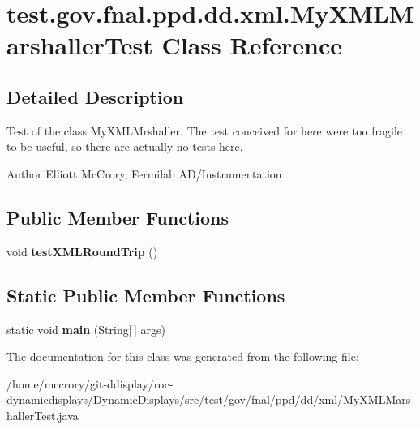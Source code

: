 \hypertarget{classtest_1_1gov_1_1fnal_1_1ppd_1_1dd_1_1xml_1_1MyXMLMarshallerTest}{\section{test.\-gov.\-fnal.\-ppd.\-dd.\-xml.\-My\-X\-M\-L\-Marshaller\-Test Class Reference}
\label{classtest_1_1gov_1_1fnal_1_1ppd_1_1dd_1_1xml_1_1MyXMLMarshallerTest}
}


\subsection{Detailed Description}
Test of the class My\-X\-M\-L\-Mrshaller. The test conceived for here were too fragile to be useful, so there are actually no tests here.

\begin{DoxyAuthor}{Author}
Elliott Mc\-Crory, Fermilab A\-D/\-Instrumentation 
\end{DoxyAuthor}
\subsection*{Public Member Functions}
\begin{DoxyCompactItemize}
\item 
\hypertarget{classtest_1_1gov_1_1fnal_1_1ppd_1_1dd_1_1xml_1_1MyXMLMarshallerTest_a2c6aabb19538d73b8de668f93bf4cc74}{void {\bfseries test\-X\-M\-L\-Round\-Trip} ()}\label{classtest_1_1gov_1_1fnal_1_1ppd_1_1dd_1_1xml_1_1MyXMLMarshallerTest_a2c6aabb19538d73b8de668f93bf4cc74}

\end{DoxyCompactItemize}
\subsection*{Static Public Member Functions}
\begin{DoxyCompactItemize}
\item 
\hypertarget{classtest_1_1gov_1_1fnal_1_1ppd_1_1dd_1_1xml_1_1MyXMLMarshallerTest_aa40a509dd3eac8eedd76ad249ba8b297}{static void {\bfseries main} (String\mbox{[}$\,$\mbox{]} args)}\label{classtest_1_1gov_1_1fnal_1_1ppd_1_1dd_1_1xml_1_1MyXMLMarshallerTest_aa40a509dd3eac8eedd76ad249ba8b297}

\end{DoxyCompactItemize}


The documentation for this class was generated from the following file\-:\begin{DoxyCompactItemize}
\item 
/home/mccrory/git-\/ddisplay/roc-\/dynamicdisplays/\-Dynamic\-Displays/src/test/gov/fnal/ppd/dd/xml/My\-X\-M\-L\-Marshaller\-Test.\-java\end{DoxyCompactItemize}
